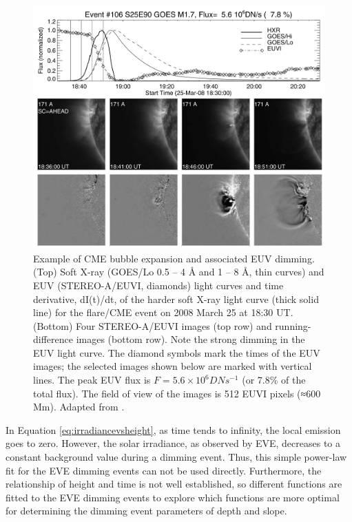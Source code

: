 \begin{figure}[!h]
    \begin{center}
	    \includegraphics[width=\textwidth]{Images/CMEExpansionLimb.png}
    \end{center}
    \caption[Limb CME expansion and dimming]{
        Example of CME bubble expansion and associated EUV dimming. (Top) Soft X-ray (GOES/Lo 0.5 – 4 Å and 1 – 8 Å, thin 
        curves) and EUV (STEREO-A/EUVI, diamonds) light curves and time derivative, dI(t)/dt, of the harder soft X-ray 
        light curve (thick solid line) for the flare/CME event on 2008 March 25 at 18:30 UT. (Bottom) Four STEREO-A/EUVI 
        images (top row) and running-difference images (bottom row). Note the strong dimming in the EUV light curve.
        The diamond symbols mark the times of the EUV images; the selected images shown below are marked with
        vertical lines. The peak EUV flux is $F = 5.6 \times 10^6 DN s^{−1}$ (or 7.8\% of the total flux). The field of 
        view of the images is 512 EUVI pixels (≈600 Mm). Adapted from \citet{Aschwanden2009a}. 
   	}
    \label{fig:limbcmedimming}
\end{figure}

In Equation \ref{eq:irradiancevsheight}, as time tends to infinity, the local emission goes to zero. However, the solar irradiance, as observed by EVE, decreases to a constant background value during a dimming event. Thus, this simple power-law fit for the EVE dimming events can not be used directly. Furthermore, the relationship of height and time is not well established, so different functions are fitted to the EVE dimming events to explore which functions are more optimal for determining the dimming event parameters of depth and slope.

